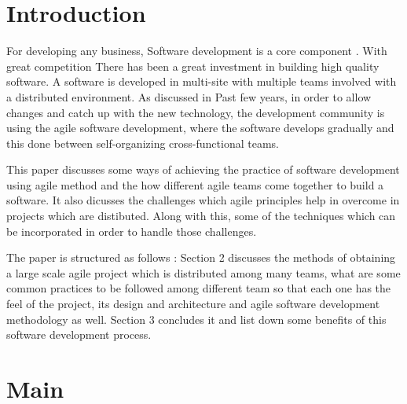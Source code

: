 \documentclass[sigconf]{acmart}
\begin{document}
\section{Introduction}
For developing any business, Software development is a core component \cite{HenrikK}. With great competition There has been a great investment in building high quality software. A software is developed in multi-site with multiple teams involved with a distributed environment. As discussed in \cite{4638656}Past few years, in order to allow changes and catch up with the new technology, the development community is using the agile software development, where the software develops gradually and this done between self-organizing cross-functional teams\cite{Moe:2014:NLD:2652524.2652584}. 

This paper discusses some ways of achieving the practice of software development using agile method and the how different agile teams come together to build a software\cite{SunitP}. It also dicusses the challenges which agile principles help in overcome in projects which are distibuted. Along with this, some of the techniques which can be incorporated in order to handle those challenges.

The paper is structured as follows : Section 2 discusses the methods of obtaining a large scale agile project which is distributed among many teams, what are some common practices to be followed among different team so that each one has the feel of the project, its design and architecture\cite{de2010conducting} and agile software development methodology as well. Section 3 concludes it and list down some benefits of this software development process.

\section{Main}
\end{document}
